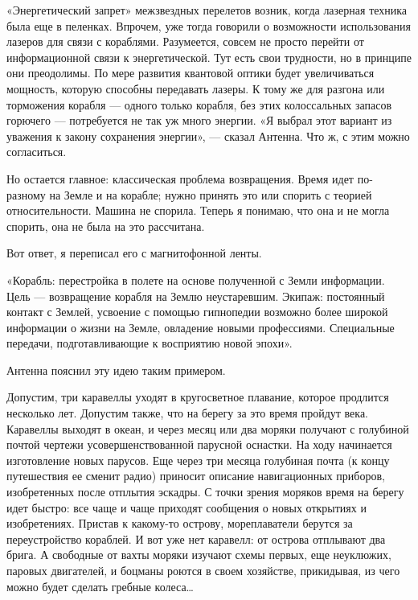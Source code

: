 «Энергетический  запрет»  межзвездных  перелетов  возник,  когда  лазерная
техника была еще  в пеленках.  Впрочем, уже тогда  говорили о  возможности
использования лазеров для связи с кораблями. Разумеется, совсем не  просто
перейти от информационной связи к энергетической. Тут есть свои трудности,
но в  принципе они  преодолимы. По  мере развития  квантовой оптики  будет
увеличиваться мощность, которую способны передавать лазеры. К тому же  для
разгона  или  торможения  корабля  —  одного  только  корабля,  без   этих
колоссальных запасов горючего —  потребуется не так  уж много энергии.  «Я
выбрал этот вариант  из уважения  к закону сохранения  энергии», —  сказал
Антенна. Что ж, с этим можно согласиться.

Но  остается  главное:  классическая  проблема  возвращения.  Время   идет
по-разному на Земле и на корабле; нужно принять это или спорить с  теорией
относительности. Машина не спорила. Теперь я  понимаю, что она и не  могла
спорить, она не была на это рассчитана.

Вот ответ, я переписал его с магнитофонной ленты.

«Корабль: перестройка в  полете на основе  полученной с Земли  информации.
Цель —  возвращение  корабля  на Землю  неустаревшим.  Экипаж:  постоянный
контакт с Землей,  усвоение с  помощью гипнопедии  возможно более  широкой
информации о  жизни на  Земле, овладение  новыми профессиями.  Специальные
передачи, подготавливающие к восприятию новой эпохи».

Антенна пояснил эту идею таким примером.

Допустим, три каравеллы уходят в кругосветное плавание, которое  продлится
несколько лет. Допустим также,  что на берегу за  это время пройдут  века.
Каравеллы выходят  в  океан, и  через  месяц  или два  моряки  получают  с
голубиной почтой чертежи  усовершенствованной парусной  оснастки. На  ходу
начинается изготовление  новых парусов.  Еще  через три  месяца  голубиная
почта  (к   концу  путешествия   ее   сменит  радио)   приносит   описание
навигационных приборов,  изобретенных  после  отплытия  эскадры.  С  точки
зрения моряков  время на  берегу идет  быстро: все  чаще и  чаще  приходят
сообщения о новых открытиях и  изобретениях. Пристав к какому-то  острову,
мореплаватели берутся за переустройство кораблей. И вот уже нет  каравелл:
от острова отплывают два брига. А свободные от вахты моряки изучают  схемы
первых, еще  неуклюжих,  паровых  двигателей, и  боцманы  роются  в  своем
хозяйстве, прикидывая, из чего можно будет сделать гребные колеса…

